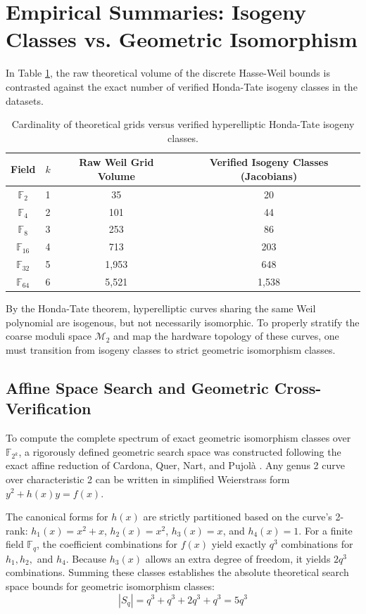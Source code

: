 \documentclass[letterpaper, 11pt]{article}
\begin{document}
\section{Empirical Summaries: Isogeny Classes vs. Geometric Isomorphism}
In Table \ref{tab:isogeny_classes}, the raw theoretical volume of the discrete Hasse-Weil bounds is contrasted against the exact number of verified Honda-Tate isogeny classes in the datasets.

\begin{table}[h!]
\centering
\begin{tabular}{cccc}
\toprule
Field & $k$ & Raw Weil Grid Volume & Verified Isogeny Classes (Jacobians) \\
\midrule
$\mathbb{F}_2$ & 1 & 35 & 20 \\
$\mathbb{F}_4$ & 2 & 101 & 44 \\
$\mathbb{F}_8$ & 3 & 253 & 86 \\
$\mathbb{F}_{16}$ & 4 & 713 & 203 \\
$\mathbb{F}_{32}$ & 5 & 1,953 & 648 \\
$\mathbb{F}_{64}$ & 6 & 5,521 & 1,538 \\
\bottomrule
\end{tabular}
\caption{Cardinality of theoretical grids versus verified hyperelliptic Honda-Tate isogeny classes.}
\label{tab:isogeny_classes}
\end{table}

By the Honda-Tate theorem, hyperelliptic curves sharing the same Weil polynomial are isogenous, but not necessarily isomorphic. To properly stratify the coarse moduli space $\mathcal{M}_2$ \cite{Zobernig2021} and map the hardware topology of these curves, one must transition from isogeny classes to strict geometric isomorphism classes.

\subsection{Affine Space Search and Geometric Cross-Verification}
To compute the complete spectrum of exact geometric isomorphism classes over $\mathbb{F}_{2^k}$, a rigorously defined geometric search space was constructed following the exact affine reduction of Cardona, Quer, Nart, and Pujolà \cite{Cardona2005}. Any genus 2 curve over characteristic 2 can be written in simplified Weierstrass form $y^2 + h(x)y = f(x)$. 

The canonical forms for $h(x)$ are strictly partitioned based on the curve's 2-rank: $h_1(x) = x^2 + x$, $h_2(x) = x^2$, $h_3(x) = x$, and $h_4(x) = 1$. For a finite field $\mathbb{F}_q$, the coefficient combinations for $f(x)$ yield exactly $q^3$ combinations for $h_1, h_2,$ and $h_4$. Because $h_3(x)$ allows an extra degree of freedom, it yields $2q^3$ combinations. Summing these classes establishes the absolute theoretical search space bounds for geometric isomorphism classes:
\begin{equation}
    |S_q| = q^3 + q^3 + 2q^3 + q^3 = 5q^3
\end{equation}
\end{document}

